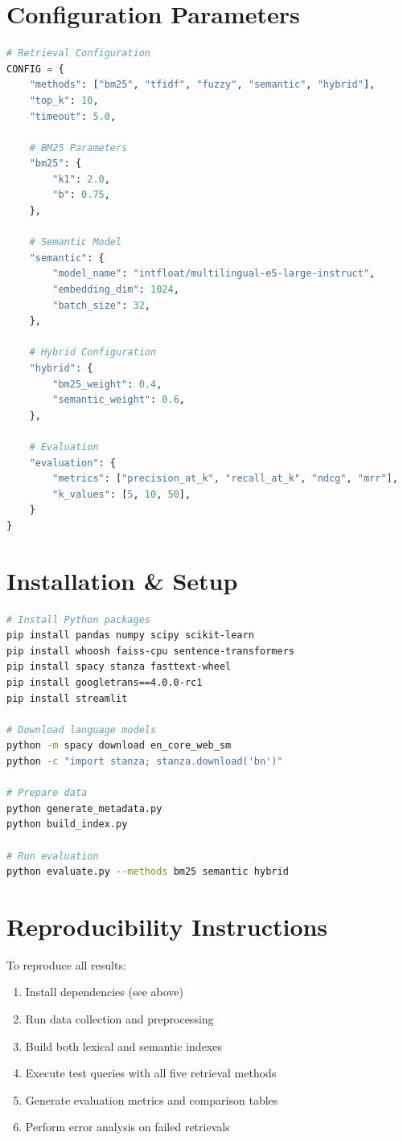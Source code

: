 \documentclass[12pt,a4paper]{report}
\begin{document}
\section{Configuration Parameters}

\begin{lstlisting}[language=Python, caption=System Configuration]
# Retrieval Configuration
CONFIG = {
    "methods": ["bm25", "tfidf", "fuzzy", "semantic", "hybrid"],
    "top_k": 10,
    "timeout": 5.0,
    
    # BM25 Parameters
    "bm25": {
        "k1": 2.0,
        "b": 0.75,
    },
    
    # Semantic Model
    "semantic": {
        "model_name": "intfloat/multilingual-e5-large-instruct",
        "embedding_dim": 1024,
        "batch_size": 32,
    },
    
    # Hybrid Configuration
    "hybrid": {
        "bm25_weight": 0.4,
        "semantic_weight": 0.6,
    },
    
    # Evaluation
    "evaluation": {
        "metrics": ["precision_at_k", "recall_at_k", "ndcg", "mrr"],
        "k_values": [5, 10, 50],
    }
}
\end{lstlisting}

\section{Installation \& Setup}

\begin{lstlisting}[language=bash, caption=Environment Setup]
# Install Python packages
pip install pandas numpy scipy scikit-learn
pip install whoosh faiss-cpu sentence-transformers
pip install spacy stanza fasttext-wheel
pip install googletrans==4.0.0-rc1
pip install streamlit

# Download language models
python -m spacy download en_core_web_sm
python -c "import stanza; stanza.download('bn')"

# Prepare data
python generate_metadata.py
python build_index.py

# Run evaluation
python evaluate.py --methods bm25 semantic hybrid
\end{lstlisting}

\section{Reproducibility Instructions}

To reproduce all results:

\begin{enumerate}
    \item Install dependencies (see above)
    \item Run data collection and preprocessing
    \item Build both lexical and semantic indexes
    \item Execute test queries with all five retrieval methods
    \item Generate evaluation metrics and comparison tables
    \item Perform error analysis on failed retrievals
\end{enumerate}
\end{document}
